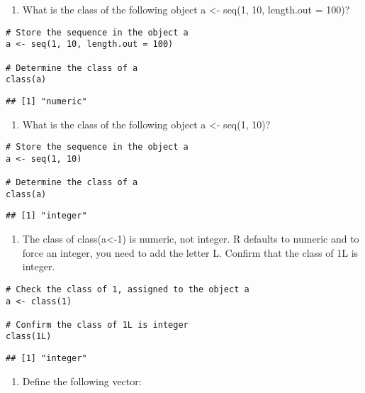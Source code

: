\documentclass[
]{article}
\providecommand{\tightlist}{%
  \setlength{\itemsep}{0pt}\setlength{\parskip}{0pt}}
\begin{document}
\begin{enumerate}
\def\labelenumi{\arabic{enumi}.}
\setcounter{enumi}{8}
\tightlist
\item
  What is the class of the following object a \textless- seq(1, 10,
  length.out = 100)?
\end{enumerate}

\begin{verbatim}
# Store the sequence in the object a
a <- seq(1, 10, length.out = 100)

# Determine the class of a
class(a)
\end{verbatim}

\begin{verbatim}
## [1] "numeric"
\end{verbatim}

\begin{enumerate}
\def\labelenumi{\arabic{enumi}.}
\setcounter{enumi}{9}
\tightlist
\item
  What is the class of the following object a \textless- seq(1, 10)?
\end{enumerate}

\begin{verbatim}
# Store the sequence in the object a
a <- seq(1, 10)

# Determine the class of a
class(a)
\end{verbatim}

\begin{verbatim}
## [1] "integer"
\end{verbatim}

\begin{enumerate}
\def\labelenumi{\arabic{enumi}.}
\setcounter{enumi}{10}
\tightlist
\item
  The class of class(a\textless-1) is numeric, not integer. R defaults
  to numeric and to force an integer, you need to add the letter L.
  Confirm that the class of 1L is integer.
\end{enumerate}

\begin{verbatim}
# Check the class of 1, assigned to the object a
a <- class(1)

# Confirm the class of 1L is integer
class(1L)
\end{verbatim}

\begin{verbatim}
## [1] "integer"
\end{verbatim}

\begin{enumerate}
\def\labelenumi{\arabic{enumi}.}
\setcounter{enumi}{11}
\tightlist
\item
  Define the following vector:
\end{enumerate}
\end{document}
